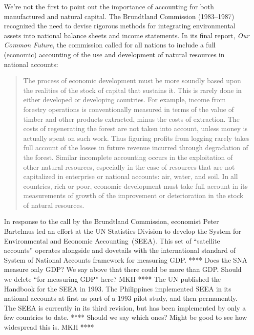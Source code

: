 \vspace{10 mm}

We're not the first to point out the importance of accounting 
for both manufactured and natural capital. 
The Brundtland Commission (1983--1987) recognized the need 
to devise rigorous methods for integrating environmental assets 
into national balance sheets and income statements. In its final
report, \emph{Our Common Future}, the commission called for all nations to
include a full (economic) accounting
of the use and development of natural resources 
in national accounts:

\begin{quote}
	The process of economic development must be more soundly 
	based upon the realities of the stock of capital that sustains it. 
	This is rarely done in either developed or developing countries. 
	For example, income from forestry operations is conventionally measured 
	in terms of the value of timber and other products extracted, 
	minus the costs of extraction. 
	The costs of regenerating the forest are not taken into account, 
	unless money is actually spent on such work. 
	Thus figuring profits from logging rarely takes full account 
	of the losses in future revenue incurred through degradation of the forest. 
	Similar incomplete accounting occurs in the exploitation 
	of other natural resources, 
	especially in the case of resources that are not capitalized 
	in enterprise or national accounts: air, water, and soil. 
	In all countries, rich or poor, 
	economic development must take full account 
	in its measurements of growth of the improvement or 
	deterioration in the stock 
	of natural resources.\cite[Chapter 2, paragraph 36]{brundtland1987}
\end{quote}

In response to the call by the Brundtland Commission, 
economist Peter Bartelmus led an effort at the UN Statistics Division 
to develop the 
System for Environmental and Economic Accounting~(SEEA).\cite{Bartelmus1991} 
This set of ``satellite accounts'' operates alongside and dovetails with 
the international standard of System of National Accounts framework for measuring GDP.
**** Does the SNA measure only GDP? 
We say above that there could be more than GDP.
Should we delete ``for measuring GDP'' here? MKH ****
The UN published the Handbook for the SEEA in 1993.\cite{UNSEEA1993} 
The Philippines implemented SEEA in its national accounts 
at first as part of a 1993 pilot study, 
and then permanently.\cite{uno1998, PhilippinesSEEAWeb}
The SEEA is currently in its third revision, 
but has been implemented 
by only a few countries to date.\cite{UNSEEAWeb,PhilippinesSEEAWeb} 
**** Should we say which ones? 
Might be good to see how widespread this is. MKH ****

